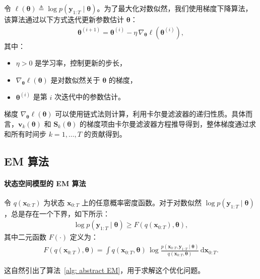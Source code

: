令 \(\ell(\boldsymbol{\theta}) \triangleq \log p(\mathbf{y}_{1:T} \mid \boldsymbol{\theta})\)。为了最大化对数似然，我们使用梯度下降算法，该算法通过以下方式迭代更新参数估计 \(\boldsymbol{\theta}\)：
\begin{align*}
    \boldsymbol{\theta}^{(i+1)} = \boldsymbol{\theta}^{(i)} - \eta \, \nabla_{\boldsymbol{\theta}} \ell(\boldsymbol{\theta}^{(i)}),
\end{align*}
其中：
\begin{itemize}
    \item \(\eta > 0\) 是学习率，控制更新的步长，
    \item \(\nabla_{\boldsymbol{\theta}} \ell(\boldsymbol{\theta})\) 是对数似然关于 \(\boldsymbol{\theta}\) 的梯度，
    \item \(\boldsymbol{\theta}^{(i)}\) 是第 \(i\) 次迭代中的参数估计。
\end{itemize}

梯度 \(\nabla_{\boldsymbol{\theta}} \ell(\boldsymbol{\theta})\) 可以使用链式法则计算，利用卡尔曼滤波器的递归性质。具体而言，\(\mathbf{v}_k(\boldsymbol{\theta})\) 和 \(\mathbf{S}_k(\boldsymbol{\theta})\) 的梯度项由卡尔曼滤波器方程推导得到，整体梯度通过求和所有时间步 \(k = 1, \dots, T\) 的贡献得到。

\subsection{EM 算法}
\paragraph*{状态空间模型的 EM 算法}
令 \(q(\mathbf{x}_{0:T})\) 为状态 \(\mathbf{x}_{0:T}\) 上的任意概率密度函数。对于对数似然 \(\log p(\mathbf{y}_{1:T} \mid \boldsymbol{\theta})\)，总是存在一个下界，如下所示：
\begin{align}
    \log p(\mathbf{y}_{1:T} \mid \boldsymbol{\theta}) \ge F(q(\mathbf{x}_{0:T}), \boldsymbol{\theta}), \label{eq: ineq for EM}
\end{align}
其中二元函数 \(F(\cdot)\) 定义为：
\begin{align*}
    F(q(\mathbf{x}_{0:T}), \boldsymbol{\theta}) = \int q(\mathbf{x}_{0:T}, \boldsymbol{\theta}) \, \log \frac{p(\mathbf{x}_{0:T}, \mathbf{y}_{1:T} \mid \boldsymbol{\theta})}{q(\mathbf{x}_{0:T}, \boldsymbol{\theta})} \, \mathrm{d} \mathbf{x}_{0:T}.
\end{align*}

这自然引出了算法~\ref{alg: abstract EM}，用于求解这个优化问题。

